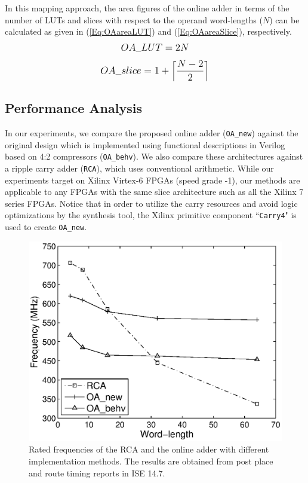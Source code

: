 \documentclass[conference]{IEEEtran}
\begin{document}
In this mapping approach, the area figures of the online adder in terms of the number of LUTs and slices with respect to the operand word-lengths ($N$) can be calculated as given in (\ref{Eq:OAareaLUT}) and (\ref{Eq:OAareaSlice}), respectively.
%
\begin{eqnarray}\label{Eq:OAareaLUT}
\scriptsize
	OA\_LUT = 2N
\normalsize
\end{eqnarray}
%
\begin{eqnarray}\label{Eq:OAareaSlice}
\footnotesize
	OA\_slice = 1+\left\lceil\frac{N-2}{2}\right\rceil
\normalsize
\end{eqnarray}

\subsection{Performance Analysis}\label{subsec:OA_Performance}
In our experiments, we compare the proposed online adder (\texttt{OA\_new}) against the original design which is implemented using functional descriptions in Verilog based on 4:2 compressors (\texttt{OA\_behv}).  We also compare these architectures against a ripple carry adder (\texttt{RCA}), which uses conventional arithmetic. While our experiments target on Xilinx Virtex-6 FPGAs (speed grade -1), our methods are applicable to any FPGAs with the same slice architecture such as all the Xilinx 7 series FPGAs. Notice that in order to utilize the carry resources and avoid logic optimizations by the synthesis tool, the Xilinx primitive component ``\texttt{Carry4}" is used to create \texttt{OA\_new}.

\begin{figure}[tbp]
	\centering
	\includegraphics[width=.45\textwidth]{./Figures/Exp/Adder_Freq.eps}
	\caption{Rated frequencies of the RCA and the online adder with different implementation methods. The results are obtained from post place and route timing reports in ISE 14.7.}
	\label{Fig:AdderFreq}
	\vspace{-1ex}
\end{figure}
\end{document}

